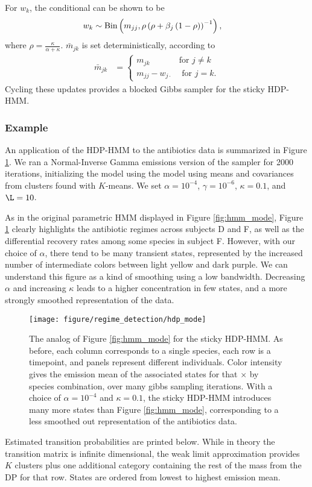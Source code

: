For $w_k$, the conditional can be shown to be
\begin{align*}
  w_k &\sim \textnormal{Bin}\left(m_{jj}, \rho\left(\rho + \beta_j\left(1 - \rho\right)\right)^{-1}\right),
\end{align*}
where $\rho = \frac{\kappa}{\alpha + \kappa}$. $\bar{m}_{jk}$ is set
deterministically, according to
\begin{align*}
  \bar{m}_{jk} &= \begin{cases}
    m_{jk} &\text{for } j \neq k\\
    m_{jj} - w_{j \cdot} &\text{ for } j = k.
  \end{cases}
\end{align*}
Cycling these updates provides a blocked Gibbs sampler for the sticky HDP-HMM.

\subsubsection{Example}
\label{subsubsec:sticky_hdp_hmm_example}

An application of the HDP-HMM to the antibiotics data is summarized in Figure
\ref{fig:hdp_mode}. We ran a Normal-Inverse Gamma emissions version of the
sampler for 2000 iterations, initializing the model using the model using means
and covariances from clusters found with $K$-means. We set $\alpha = 10^{-4}$,
$\gamma = 10^{-6}$, $\kappa = 0.1$, and $\L = 10$.

As in the original parametric HMM displayed in Figure \ref{fig:hmm_mode}, Figure
\ref{fig:hdp_mode} clearly highlights the antibiotic regimes across subjects D
and F, as well as the differential recovery rates among some species in subject
F. However, with our choice of $\alpha$, there tend to be many transient states,
represented by the increased number of intermediate colors between light yellow
and dark purple. We can understand this figure as a kind of smoothing using a
low bandwidth. Decreasing $\alpha$ and increasing $\kappa$ leads to a higher
concentration in few states, and a more strongly smoothed representation of the
data.

\begin{figure}
  \centering
  \texttt{[image: figure/regime\_detection/hdp\_mode]}
  \caption{
    The analog of Figure \ref{fig:hmm_mode} for the sticky HDP-HMM. As before,
    each column corresponds to a single species, each row is a timepoint, and
    panels represent different individuals. Color intensity gives the emission
    mean of the associated states for that $\times$ by species combination, over
    many gibbs sampling iterations. With a choice of $\alpha = 10^{-4}$ and
    $\kappa = 0.1$, the sticky HDP-HMM introduces many more states than Figure
    \ref{fig:hmm_mode}, corresponding to a less smoothed out representation of
    the antibiotics data. \label{fig:hdp_mode} }
\end{figure}
Estimated transition probabilities are printed below. While in theory the
transition matrix is infinite dimensional, the weak limit approximation provides
$K$ clusters plus one additional category containing the rest of the mass from
the DP for that row. States are ordered from lowest to highest emission mean.

